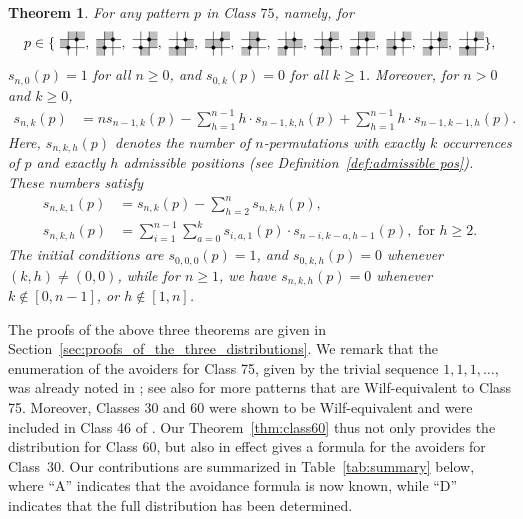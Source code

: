 \documentclass[12pt]{article}
\newtheorem{thm}{Theorem}[section]
\newcommand{\pattern}[4]{										
	\raisebox{0.6ex}{
		\begin{tikzpicture}[scale=0.35, baseline=(current bounding box.center), #1]
		\foreach \x/\y in {#4}		\fill[gray!50] (\x,\y) rectangle +(1,1);

		\draw (0.01,0.01) grid (#2+0.99,#2+0.99);
		\foreach \x/\y in {#3}		\filldraw (\x,\y) circle (6pt);
		\end{tikzpicture}}
}
\begin{document}
\begin{thm}\label{thm:class75}
For any pattern $p$ in Class $75$, namely, for
$$
p\in\{\pattern{scale=0.6}{2}{1/1,2/2}{1/2,2/2,0/1}, 
\pattern{scale=0.6}{2}{1/1,2/2}{1/2,0/1,0/0},
\pattern{scale=0.6}{2}{1/1,2/2}{2/2,2/1,1/0}, 
\pattern{scale=0.6}{2}{1/1,2/2}{2/1,1/0,0/0},
\pattern{scale=0.6}{2}{1/1,2/2}{2/2,0/1,1/1},
\pattern{scale=0.6}{2}{1/1,2/2}{1/2,1/1,0/0},
\pattern{scale=0.6}{2}{1/1,2/2}{1/1,2/1,0/0},
\pattern{scale=0.6}{2}{1/1,2/2}{2/2,1/1,1/0},
\pattern{scale=0.6}{2}{1/1,2/2}{1/2,2/2,0/0},
\pattern{scale=0.6}{2}{1/1,2/2}{2/2,0/1,0/0},
\pattern{scale=0.6}{2}{1/1,2/2}{2/2,2/1,0/0},
\pattern{scale=0.6}{2}{1/1,2/2}{2/2,0/0,1/0}\},
$$
$s_{n,0}(p)=1$ for all $n\geq 0$, and $s_{0,k}(p)=0$ for all $k\geq 1$. Moreover, for $n>0$ and $k\geq 0$, 
\begin{align}\label{thm:class75-rec-1}
s_{n,k}(p)
&=
n s_{n-1,k}(p)-\sum_{h=1}^{n-1} h \cdot s_{n-1,k,h}(p)
+\sum_{h=1}^{n-1} h \cdot s_{n-1,k-1,h}(p).
\end{align}
Here, $s_{n,k,h}(p)$ denotes the number of $n$-permutations with exactly $k$ occurrences of $p$ and exactly $h$ admissible positions (see Definition~\ref{def:admissible pos}). These numbers satisfy
\begin{align}
s_{n,k,1}(p) &= s_{n,k}(p) - \sum_{h=2}^{n} s_{n,k,h}(p), \label{thm:class75-rec-2} \\
s_{n,k,h}(p) &= \sum_{i=1}^{n-1}\sum_{a=0}^{k}s_{i,a,1}(p)\cdot s_{n-i,k-a,h-1}(p),  \text{ for } h\geq 2. \label{thm:class75-rec-3}
\end{align}
The initial conditions are $s_{0,0,0}(p)=1$, and $s_{0,k,h}(p)=0$ whenever $(k,h)\neq(0,0)$, while for $n\geq 1$, we have $s_{n,k,h}(p)=0$ whenever $k\not\in [0,n-1]$, or $h\not\in [1,n]$.
\end{thm}

The proofs of the above three theorems are given in Section~\ref{sec:proofs_of_the_three_distributions}. We remark that the enumeration of the avoiders for Class 75, given by the trivial sequence $1,1,1,\ldots$, was already noted in \cite[Tab.~1]{Hilmarsson2015Wilf}; see also \cite[Thm.~7.3]{SKZ2026} for more patterns that are Wilf-equivalent to Class 75. Moreover, Classes 30 and 60 were shown to be Wilf-equivalent and were included in Class 46 of \cite[Tab.~10]{Hilmarsson2015Wilf}. Our Theorem~\ref{thm:class60} thus not only provides the distribution for Class 60, but also in effect gives a formula for the avoiders for Class~30. Our contributions are summarized in Table~\ref{tab:summary} below, where ``A'' indicates that the avoidance formula is now known, while ``D'' indicates that the full distribution has been determined.
\end{document}
